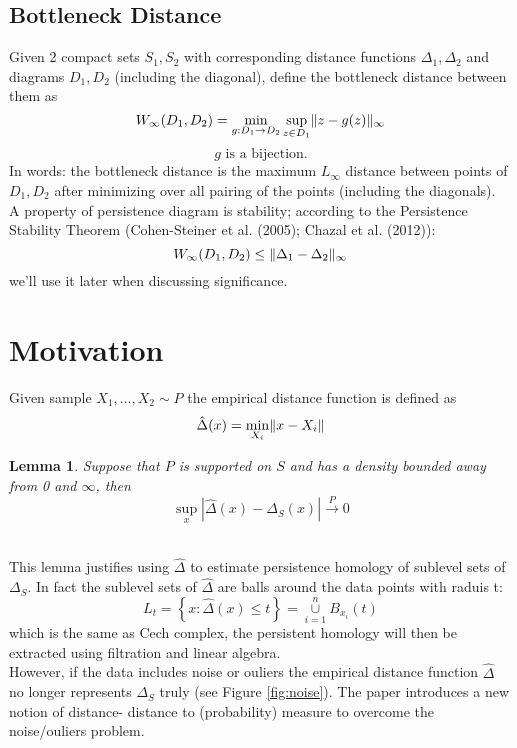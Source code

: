 \documentclass[11pt]{article}
\newtheorem{lemma}[theorem]{Lemma}
\theoremstyle{definition}
\theoremstyle{definition}
\begin{document}

\subsection{Bottleneck Distance}
Given 2 compact sets $S_1,S_2$ with corresponding distance functions $\Delta_1, \Delta_2$ and diagrams $D_1,D_2$ (including the diagonal), define the bottleneck distance between them as
$$W_\infty (D_1,D_2) = \min_{g: D_1 \rightarrow D_2} \sup_{z \in D_1} \mathopen\| z - g(z) \mathclose\|_\infty$$
$$g \text{ is a bijection.}$$
In words: the bottleneck distance is the maximum $L_\infty$ distance between points of $D_1,D_2$ after minimizing over all pairing of the points (including the diagonals).\\
A property of persistence diagram is stability; according to the Persistence Stability Theorem (Cohen-Steiner et al. (2005); Chazal et al. (2012)):
$$W_\infty (D_1,D_2) \leq \mathopen\| \Delta_1 - \Delta_2 \mathclose\|_\infty$$
we'll use it later when discussing significance.




\section{Motivation}

Given sample $X_1,...,X_2 \sim P$ the empirical distance function is defined as
$$\hat{\Delta}(x) = \min_{X_i} \mathopen\| x-X_i \mathclose\|$$

\begin{lemma}
	Suppose that $P$ is supported on $S$ and has a density bounded away from 0 and $\infty$, then
	$$\sup_{x} |\hat{\Delta}(x) - \Delta_S(x)| \overset{P}{\rightarrow} 0$$
\end{lemma}
\text{ }\\
This lemma justifies using $\hat{\Delta}$ to estimate persistence homology of sublevel sets of $\Delta_S$. In fact the sublevel sets of $\hat{\Delta}$ are balls around the data points with raduis t:
$$L_t = \left\{ x: \hat{\Delta} (x) \leq t \right\} = \overset{n}{\underset{i=1}{\cup}} B_{x_i}(t)$$
which is the same as Cech complex, the persistent homology will then be extracted using filtration and linear algebra.\\
However, if the data includes noise or ouliers the empirical distance function $\hat\Delta$ no longer represents $\Delta_S$ truly (see Figure \ref{fig:noise}). The paper introduces a new notion of distance- distance to (probability) measure to overcome the noise/ouliers problem.
\end{document}
